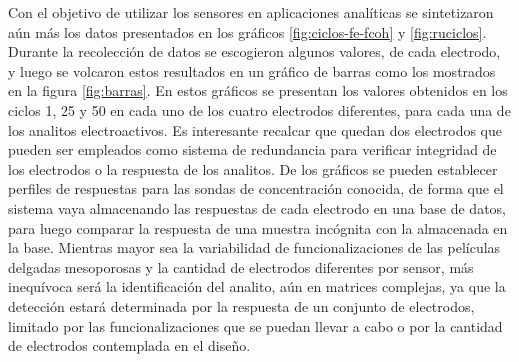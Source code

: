 	 Con el objetivo de utilizar los sensores en aplicaciones analíticas se sintetizaron aún más los datos presentados en los gráficos \ref{fig:ciclos-fe-fcoh} y \ref{fig:ruciclos}. Durante la recolección de datos se escogieron algunos valores, de cada electrodo, y luego se volcaron estos resultados en un gráfico de barras como los mostrados en la figura \ref{fig:barras}. En estos gráficos se presentan los valores obtenidos en los ciclos 1, 25 y 50 en cada uno de los cuatro electrodos diferentes, para cada una de los analitos electroactivos. Es interesante recalcar que quedan dos electrodos que pueden ser empleados como sistema de redundancia para verificar integridad de los electrodos o la respuesta de los analitos. De los gráficos se pueden establecer perfiles de respuestas para las sondas de concentración conocida, de forma que el sistema vaya almacenando las respuestas de cada electrodo en una base de datos, para luego comparar la respuesta de una muestra incógnita con la almacenada en la base. Mientras mayor sea la variabilidad de funcionalizaciones de las películas delgadas mesoporosas y la cantidad de electrodos diferentes por sensor, más inequívoca será la identificación del analito, aún en matrices complejas, ya que la detección estará determinada por la respuesta de un conjunto de electrodos, limitado por las funcionalizaciones que se puedan llevar a cabo o por la cantidad de electrodos contemplada en el diseño.
   		

